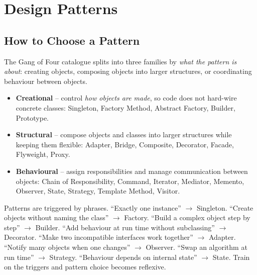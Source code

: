 \chapter{Design Patterns}

\section{How to Choose a Pattern}
\label{sec:patterns-intro}

The Gang of Four catalogue splits into three families by \emph{what the
pattern is about}: creating objects, composing objects into larger
structures, or coordinating behaviour between objects.

\begin{patternbox}
\begin{itemize}
  \item \textbf{Creational} -- control \emph{how objects are made}, so
        code does not hard-wire concrete classes: Singleton, Factory
        Method, Abstract Factory, Builder, Prototype.
  \item \textbf{Structural} -- compose objects and classes into larger
        structures while keeping them flexible: Adapter, Bridge,
        Composite, Decorator, Facade, Flyweight, Proxy.
  \item \textbf{Behavioural} -- assign responsibilities and manage
        communication between objects: Chain of Responsibility, Command,
        Iterator, Mediator, Memento, Observer, State, Strategy, Template
        Method, Visitor.
\end{itemize}
\end{patternbox}

\begin{ideabox}
Patterns are triggered by phrases. ``Exactly one instance'' $\to$
Singleton. ``Create objects without naming the class'' $\to$ Factory.
``Build a complex object step by step'' $\to$ Builder. ``Add behaviour at
run time without subclassing'' $\to$ Decorator. ``Make two incompatible
interfaces work together'' $\to$ Adapter. ``Notify many objects when one
changes'' $\to$ Observer. ``Swap an algorithm at run time'' $\to$
Strategy. ``Behaviour depends on internal state'' $\to$ State. Train on
the triggers and pattern choice becomes reflexive.
\end{ideabox}

